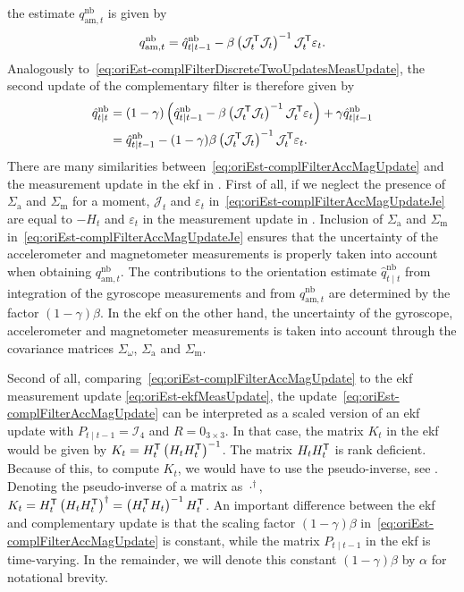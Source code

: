 the estimate $q_{\text{am},t}^\text{nb}$ is given by
\begin{align}
q_{\text{am},t}^\text{nb} = \hat{q}_{t \mid t-1}^\text{nb} - \beta \left( \mathcal{J}_t^{\mathsf{T}} \mathcal{J}_t \right)^{-1} \mathcal{J}_t^{\mathsf{T}} \varepsilon_t.
\end{align}
Analogously to~\eqref{eq:oriEst-complFilterDiscreteTwoUpdatesMeasUpdate}, the second update of the complementary filter is therefore given by
\begin{align}
\label{eq:oriEst-complFilterAccMagUpdate}
\hat{q}_{t \mid t}^\text{nb} &= ( 1 - \gamma ) \left( \hat{q}_{t \mid t-1}^\text{nb} - \beta \left( \mathcal{J}_t^{\mathsf{T}} \mathcal{J}_t \right)^{-1} \mathcal{J}_t^{\mathsf{T}} \varepsilon_t \right) + \gamma \hat{q}_{t \mid t-1}^\text{nb} \nonumber \\
&=  \hat{q}_{t \mid t-1}^\text{nb} - ( 1 - \gamma ) \beta \left( \mathcal{J}_t^{\mathsf{T}} \mathcal{J}_t \right)^{-1} \mathcal{J}_t^{\mathsf{T}} \varepsilon_t.
\end{align}
There are many similarities between~\eqref{eq:oriEst-complFilterAccMagUpdate} and the measurement update in the \gls{ekf} in . First of all, if we neglect the presence of $\Sigma_\text{a}$ and $\Sigma_\text{m}$ for a moment, $\mathcal{J}_t$ and $\varepsilon_t$ in~\eqref{eq:oriEst-complFilterAccMagUpdateJe} are equal to $- H_t$ and $\varepsilon_t$ in the measurement update in . Inclusion of $\Sigma_\text{a}$ and $\Sigma_\text{m}$ in~\eqref{eq:oriEst-complFilterAccMagUpdateJe} ensures that the uncertainty of the accelerometer and magnetometer measurements is properly taken into account when obtaining $q_{\text{am},t}^\text{nb}$. The contributions to the orientation estimate $\hat{q}_{t \mid t}^\text{nb}$ from integration of the gyroscope measurements and from $q_{\text{am},t}^\text{nb}$ are determined by the factor $(1 - \gamma) \beta$. In the \gls{ekf} on the other hand, the uncertainty of the gyroscope, accelerometer and magnetometer measurements is taken into account through the covariance matrices $\Sigma_\omega$, $\Sigma_\text{a}$ and $\Sigma_\text{m}$.

Second of all, comparing~\eqref{eq:oriEst-complFilterAccMagUpdate} to the \gls{ekf} measurement update \eqref{eq:oriEst-ekfMeasUpdate}, the update~\eqref{eq:oriEst-complFilterAccMagUpdate} can be interpreted as a scaled version of an \gls{ekf} update with $P_{t \mid t-1} = \mathcal{I}_4$ and $R = 0_{3 \times 3}$. In that case, the matrix $K_t$ in the \gls{ekf} would be given by $K_t = H_t^{\mathsf{T}} \left( H_t H_t^{\mathsf{T}} \right)^{-1}$. The matrix $H_t H_t^{\mathsf{T}}$ is rank deficient. Because of this, to compute $K_t$, we would have to use the pseudo-inverse, see \eg \cite{golubvL:2013}. Denoting the pseudo-inverse of a matrix as $\cdot^\dagger$, $K_t = H_t^{\mathsf{T}} \left( H_t H_t^{\mathsf{T}} \right)^{\dagger} = \left( H_t^{\mathsf{T}} H_t \right)^{-1} H_t^{\mathsf{T}}$. An important difference between the \gls{ekf} and complementary update is that the scaling factor $(1 - \gamma) \beta$ in~\eqref{eq:oriEst-complFilterAccMagUpdate} is constant, while the matrix $P_{t \mid t-1}$ in the \gls{ekf} is time-varying. In the remainder, we will denote this constant $(1 - \gamma) \beta$ by $\alpha$ for notational brevity. 

